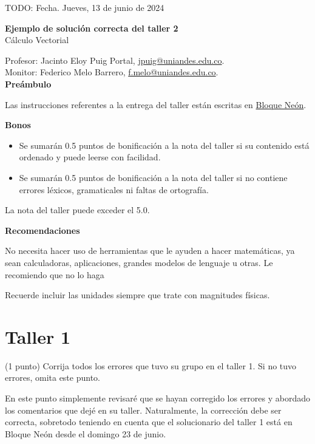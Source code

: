 \documentclass{fmbvecto}
\renewcommand{\title}{Ejemplo de solución correcta del taller 2}
\newcommand{\subject}{Cálculo Vectorial}
\begin{document}
TODO: Fecha. Jueves, 13 de junio de 2024

\begin{center}
    \textbf{\LARGE \title} \\
    {\large \subject}
\end{center}


Profesor: Jacinto Eloy Puig Portal, \href{mailto:jpuig@uniandes.edu.co}{jpuig@uniandes.edu.co}. \\
Monitor: Federico Melo Barrero, \href{mailto:f.melo@uniandes.edu.co}{f.melo@uniandes.edu.co}.\\

\textbf{\Large Preámbulo}

Las instrucciones referentes a la entrega del taller están escritas en \href{https://bloqueneon.uniandes.edu.co/d2l/home}{Bloque Neón}.

\textbf{Bonos}
\begin{itemize}
  \item Se sumarán 0.5 puntos de bonificación a la nota del taller si su contenido está ordenado y puede leerse con facilidad.
  \item Se sumarán 0.5 puntos de bonificación a la nota del taller si no contiene errores léxicos, gramaticales ni faltas de ortografía.
\end{itemize}
La nota del taller puede exceder el 5.0.

\textbf{Recomendaciones}

No necesita hacer uso de herramientas que le ayuden a hacer matemáticas, ya sean calculadoras, aplicaciones, grandes modelos de lenguaje u otras. Le recomiendo que no lo haga

Recuerde incluir las unidades siempre que trate con magnitudes físicas.

\section{Taller 1}

\begin{problema}
    
    (1 punto) Corrija todos los errores que tuvo su grupo en el taller 1. Si no tuvo errores, omita este punto.

    \vspace{1em}
    \tcblower
    
    En este punto simplemente revisaré que se hayan corregido los errores y abordado los comentarios que dejé en su taller. Naturalmente, la corrección debe ser correcta, sobretodo teniendo en cuenta que el solucionario del taller 1 está en Bloque Neón desde el domingo 23 de junio.

\end{problema}
\end{document}
